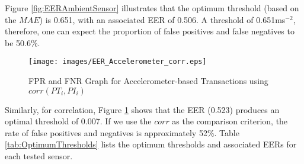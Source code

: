 \documentclass{article}
\begin{document}
Figure \ref{fig:EERAmbientSensor} illustrates that the optimum threshold (based on the $MAE$) is 0.651, with an associated EER of 0.506.  A threshold of 0.651ms$^{-2}$, therefore, one can expect the proportion of false positives and false negatives to be 50.6\%.

\begin{figure}[ht]
	\centering
		\texttt{[image: images/EER\_Accelerometer\_corr.eps]}
	\caption{FPR and FNR Graph for Accelerometer-based Transactions using $corr(PT_i, PI_i)$}
	\label{fig:EERAmbientSensorcorr}
\end{figure}

Similarly, for correlation, Figure \ref{fig:EERAmbientSensorcorr} shows that the EER (0.523) produces an optimal threshold of 0.007.  If we use the $corr$ as the comparison criterion, the rate of false positives and negatives is approximately 52\%.  Table \ref{tab:OptimumThresholds} lists the optimum thresholds and associated EERs for each tested sensor. 
\end{document}
